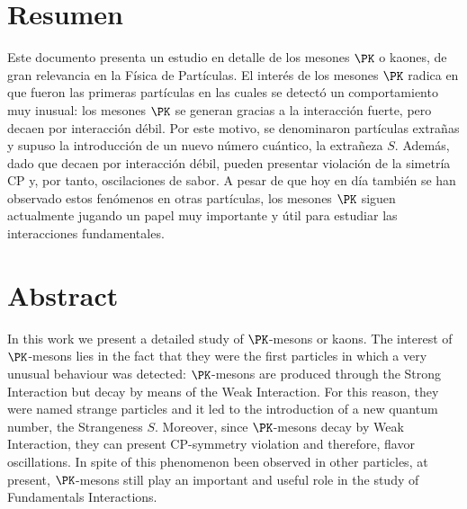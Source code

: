 \chapter*{Resumen}
\label{cap:abstract}

Este documento presenta un estudio en detalle de los mesones $\PK$ o kaones, de gran relevancia en la Física de Partículas. El interés de los mesones $\PK$ radica en que fueron las primeras partículas en las cuales se detectó un comportamiento muy inusual: los mesones $\PK$ se generan gracias a la interacción fuerte, pero decaen por interacción débil. Por este motivo, se denominaron partículas extrañas y supuso la introducción de un nuevo número cuántico, la extrañeza $S$. Además, dado que decaen por interacción débil, pueden presentar violación de la simetría CP y, por tanto, oscilaciones de sabor. A pesar de que hoy en día también se han observado estos fenómenos en otras partículas, los mesones $\PK$ siguen actualmente jugando un papel muy importante y útil para estudiar las interacciones fundamentales. 
\vspace{2cm}

{\let\clearpage\relax\chapter*{Abstract}}
In this work we present a detailed study of $\PK$-mesons or kaons. The interest of $\PK$-mesons lies in the fact that they were the first particles in which a very unusual behaviour was detected: $\PK$-mesons are produced through the Strong Interaction but decay by means of the Weak Interaction. For this reason, they were named strange particles and it led to the introduction of a new quantum number, the Strangeness $S$. Moreover, since $\PK$-mesons decay by Weak Interaction, they can present CP-symmetry violation and therefore, flavor oscillations. In spite of this phenomenon been observed  in other particles, at present, $\PK$-mesons still play an important and useful role in the study of Fundamentals Interactions.